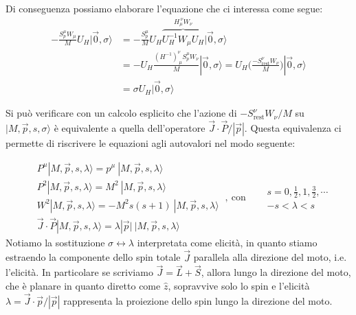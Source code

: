 \documentclass[../main.tex]{subfiles}
\begin{document}
Di conseguenza possiamo elaborare l'equazione che ci interessa come segue:
\begin{align*}
    -\frac{S^\mu_pW_\mu}{M} U_H|\Vec{0}, \sigma\rangle &= -\frac{S^\mu_p}{M} U_H \overbrace{U_H^{-1} W_\mu U_H}^{H_\mu^{~\nu}W_\nu}|\Vec{0}, \sigma\rangle \\
    &=  - U_H \frac{(H^{-1})_{~\mu}^{\nu}S^\mu_p W_\nu}{M}|\Vec{0}, \sigma\rangle = U_H \bigg(\frac{-S^\nu_\text{rest} W_\nu}{M}\bigg)|\Vec{0}, \sigma\rangle \\
    &= \sigma U_H|\Vec{0}, \sigma\rangle
\end{align*}

Si può verificare con un calcolo esplicito che l'azione di \({-S^\nu_\text{rest} W_\nu}/{M}\) su \(|M, \Vec{p}, s, \sigma\rangle\) è equivalente a quella dell'operatore \({\Vec{J}\cdot \Vec{P}}/{|\Vec{p}|}\). Questa equivalenza ci permette di riscrivere le equazioni agli autovalori nel modo seguente:

\begin{equation}
    \boxed{
        \begin{aligned}
            &P^\mu|M, \Vec{p}, s, \lambda\rangle = p^\mu~|M, \Vec{p}, s, \lambda\rangle\\
            &P^2|M, \Vec{p}, s, \lambda\rangle = M^2~|M, \Vec{p}, s, \lambda\rangle\\
            &W^2|M, \Vec{p}, s, \lambda\rangle = -M^2 s(s+1)~|M, \Vec{p}, s, \lambda\rangle\\
            &{\Vec{J}\cdot \Vec{P}}|M, \Vec{p}, s, \lambda\rangle = \lambda|\Vec{p}|~|M, \Vec{p}, s, \lambda\rangle
        \end{aligned}
        }~,~ \text{con} \quad
        \begin{aligned}
            &s=0,\frac{1}{2},1,\frac{3}{2},\cdots\\
            &-s<\lambda<s
        \end{aligned}
    \label{eq:final_eigensystem_massive}
\end{equation}
Notiamo la sostituzione \(\sigma\leftrightarrow\lambda\) interpretata come elicità, in quanto stiamo estraendo la componente dello spin totale $\Vec{J}$ parallela alla direzione del moto, i.e. l'elicità. In particolare se scriviamo $\Vec{J} = \Vec{L}+ \Vec{S}$, allora lungo la direzione del moto, che è planare in quanto diretto come $\hat z$, sopravvive solo lo spin e l'elicità $\lambda = \Vec{J}\cdot\Vec{p}/|\Vec{p}|$ rappresenta la proiezione dello spin lungo la direzione del moto.
\end{document}
